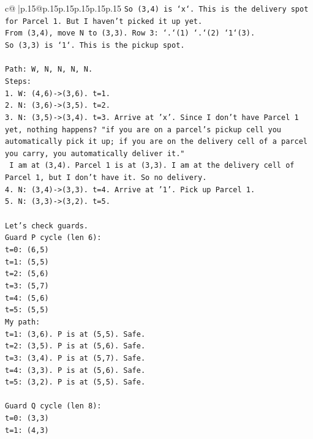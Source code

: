 \documentclass{article}
\begin{document}
{\begin{supertabular}{c@{$\;$}|p{.15\linewidth}@{}p{.15\linewidth}p{.15\linewidth}p{.15\linewidth}p{.15\linewidth}p{.15\linewidth}}
{{{\texttt{So (3,4) is `x`. This is the delivery spot for Parcel 1. But I haven't picked it up yet.} \\
\texttt{From (3,4), move N to (3,3). Row 3: `.`(1) `.`(2) `1`(3).} \\
\texttt{So (3,3) is `1`. This is the pickup spot.} \\
\\ 
\texttt{Path: W, N, N, N, N.} \\
\texttt{Steps:} \\
\texttt{1. W: (4,6){-}>(3,6). t=1.} \\
\texttt{2. N: (3,6){-}>(3,5). t=2.} \\
\texttt{3. N: (3,5){-}>(3,4). t=3. Arrive at 'x'. Since I don't have Parcel 1 yet, nothing happens? "if you are on a parcel's pickup cell you automatically pick it up; if you are on the delivery cell of a parcel you carry, you automatically deliver it."} \\
\texttt{   I am at (3,4). Parcel 1 is at (3,3). I am at the delivery cell of Parcel 1, but I don't have it. So no delivery.} \\
\texttt{4. N: (3,4){-}>(3,3). t=4. Arrive at '1'. Pick up Parcel 1.} \\
\texttt{5. N: (3,3){-}>(3,2). t=5.} \\
\\ 
\texttt{Let's check guards.} \\
\texttt{Guard P cycle (len 6):} \\
\texttt{t=0: (6,5)} \\
\texttt{t=1: (5,5)} \\
\texttt{t=2: (5,6)} \\
\texttt{t=3: (5,7)} \\
\texttt{t=4: (5,6)} \\
\texttt{t=5: (5,5)} \\
\texttt{My path:} \\
\texttt{t=1: (3,6). P is at (5,5). Safe.} \\
\texttt{t=2: (3,5). P is at (5,6). Safe.} \\
\texttt{t=3: (3,4). P is at (5,7). Safe.} \\
\texttt{t=4: (3,3). P is at (5,6). Safe.} \\
\texttt{t=5: (3,2). P is at (5,5). Safe.} \\
\\ 
\texttt{Guard Q cycle (len 8):} \\
\texttt{t=0: (3,3)} \\
\texttt{t=1: (4,3)} \\
}}}
\end{supertabular}}
\end{document}

